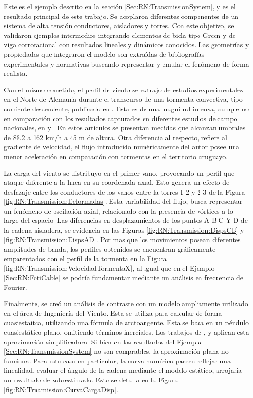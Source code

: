 Este es el ejemplo descrito en la sección \ref{Sec:RN:TransmissionSystem}, y es el resultado principal de este trabajo. Se acoplaron diferentes componentes de un sistema de alta tensión conductores, aisladores y torres. Con este objetivo, se validaron ejemplos intermedios integrando elementos de biela tipo Green y de viga corrotacional con resultados lineales y dinámicos conocidos. Las geometrías y propiedades que integraron el modelo son extraídas de bibliografías experimentales y normativas buscando representar y emular el fenómeno de forma realista. 

 Con el mismo cometido, el perfil de viento se extrajo de estudios experimentales en el Norte de Alemania durante el transcurso de una tormenta convectiva, tipo corriente descendente, publicado en \citep{stengel2017measurements}. Esta es de una magnitud intensa, aunque no en comparación con los resultados capturados en diferentes estudios de campo nacionales, en \citep{duranona2009analysis} y \citep{duranona2019first}. En estos artículos se presentan medidas que alcanzan umbrales de 88.2 a 162 km/h a 45 m de altura. Otra diferencia al respecto, refiere al gradiente de velocidad, el flujo introducido numéricamente del autor \citeauthor{stengel2017measurements} posee una menor aceleración en comparación con tormentas en el territorio uruguayo. 
 
 La carga del viento se distribuyo en el primer vano, provocando un perfil que ataque diferente a la linea en su coordenada axial. Esto genera un efecto de desfazaje entre los conductores de los vanos entre la torres 1-2 y 2-3 de la Figura \ref{fig:RN:Transmission:Deformadas}. Esta variabilidad del flujo, busca representar un fenómeno de oscilación axial, relacionado con la presencia de vórtices a lo largo del espacio. Las diferencias en desplazamientos de los puntos A B C Y D de la cadena aisladora, se evidencia en las Figuras \ref{fig:RN:Transmission:DispsCB} y \ref{fig:RN:Transmission:DispsAD}. Por mas que los movimientos posean diferentes amplitudes de banda, los perfiles obtenidos se encuentran gráficamente emparentados con el perfil de la tormenta en la Figura \ref{fig:RN:Transmission:VelocidadTormentaX}, al igual que en el Ejemplo \ref{Sec:RN:FotiCable} se podría fundamentar mediante un análisis en frecuencia de Fourier.  
 
 Finalmente, se creó un análisis de contraste con un modelo ampliamente urilizado en el área de Ingeniería del Viento. Esta se utiliza para calcular de forma cuasiestaitca, utilizando una fórmula de arctoangente. Esta se basa en un péndulo cuasiestático plano, omitiendo términos inerciales. Los trabajos de \cite{stengel2017measurements}, \cite{duranona2009analysis} y \cite{yan2009numerical} aplican esta aproximación simplificadora. Si bien en los resultados del Ejemplo \ref{Sec:RN:TransmissionSystem} no son comprables, la aproximación plana no funciona. Para este caso en particular, la curva numérica parece reflejar una linealidad, evaluar el ángulo de la cadena mediante el modelo estático, arrojaría un resultado de sobrestimado. Esto se detalla en la Figura \ref{fig:RN:Trnamission:CurvaCargaDisp}.

